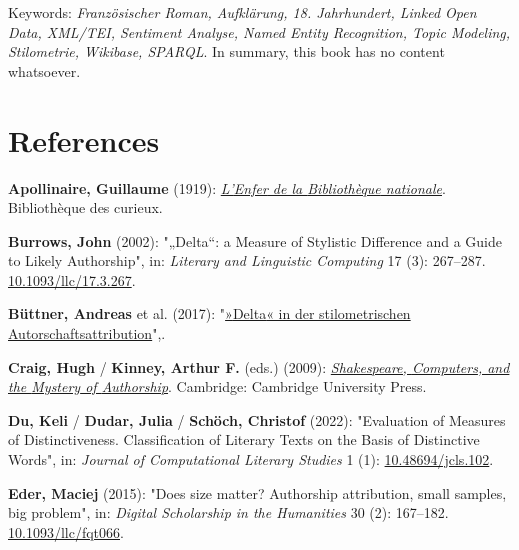 \documentclass[
  12pt,
  letterpaper,
]{classicthesis}
\newlength{\cslhangindent}
\newenvironment{CSLReferences}[2] %
 {\begin{list}{}{%
  \setlength{\itemindent}{0pt}
  \setlength{\leftmargin}{0pt}
  \setlength{\parsep}{0pt}
  \ifodd #1
   \setlength{\leftmargin}{\cslhangindent}
   \setlength{\itemindent}{-1\cslhangindent}
  \fi
  \setlength{\itemsep}{#2\baselineskip}}}
 {\end{list}}
\begin{document}
Keywords: \emph{Französischer Roman, Aufklärung, 18. Jahrhundert, Linked
Open Data, XML/TEI, Sentiment Analyse, Named Entity Recognition, Topic
Modeling, Stilometrie, Wikibase, SPARQL}. In summary, this book has no
content whatsoever.


\chapter*{References}\label{references}


\label{refs}
\begin{CSLReferences}{1}{0}
\textbf{Apollinaire, Guillaume} (1919):
\emph{\href{https://fr.wikisource.org/wiki/Livre:Apollinaire_-_L\%E2\%80\%99Enfer_de_la_Biblioth\%C3\%A8que_nationale.djvu}{L'{Enfer}
de la {Bibliothèque} nationale}}. Bibliothèque des curieux.

\textbf{Burrows, John} (2002): "{„{Delta}``}: a {Measure} of {Stylistic}
{Difference} and a {Guide} to {Likely} {Authorship}", in: \emph{Literary
and Linguistic Computing} 17 (3): 267--287.
\href{https://doi.org/10.1093/llc/17.3.267}{10.1093/llc/17.3.267}.

\textbf{Büttner, Andreas} et al. (2017):
"\href{http://dx.doi.org/10.17175/2017_006}{»{Delta}« in der
stilometrischen {Autorschaftsattribution}}",.

\textbf{Craig, Hugh} / \textbf{Kinney, Arthur F.} (eds.) (2009):
\emph{\href{https://doi.org/10.1017/CBO9780511605437}{Shakespeare,
{Computers}, and the {Mystery} of {Authorship}}}. Cambridge: Cambridge
University Press.

\textbf{Du, Keli} / \textbf{Dudar, Julia} / \textbf{Schöch, Christof}
(2022): "Evaluation of {Measures} of {Distinctiveness}. {Classification}
of {Literary} {Texts} on the {Basis} of {Distinctive} {Words}", in:
\emph{Journal of Computational Literary Studies} 1 (1):
\href{https://doi.org/10.48694/jcls.102}{10.48694/jcls.102}.

\textbf{Eder, Maciej} (2015): "Does size matter? {Authorship}
attribution, small samples, big problem", in: \emph{Digital Scholarship
in the Humanities} 30 (2): 167--182.
\href{https://doi.org/10.1093/llc/fqt066}{10.1093/llc/fqt066}.


\end{CSLReferences}
\end{document}

